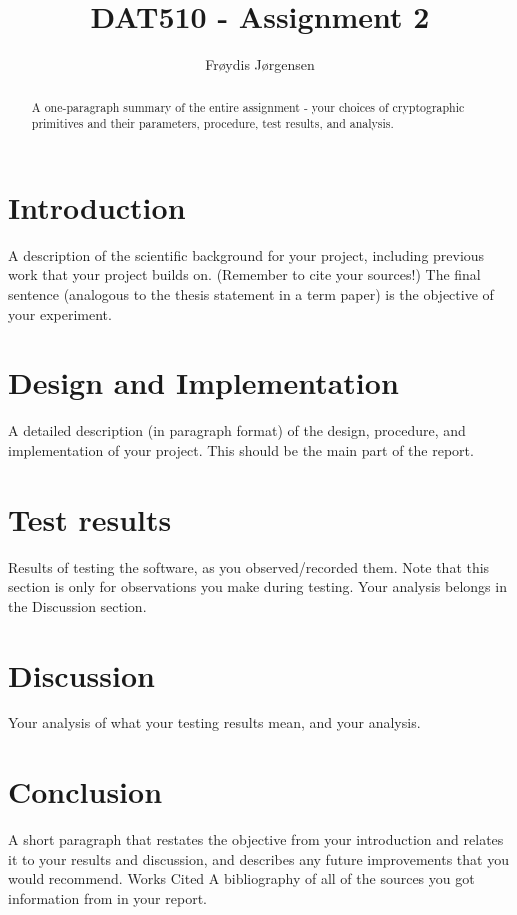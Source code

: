 \documentclass[12pt, letterpaper]{article}
\title{DAT510 - Assignment 2}
\author{Fr\o ydis J\o rgensen}
\begin{document}
\begin{titlepage}
\maketitle
\end{titlepage}


\begin{abstract}
A one-paragraph summary of the entire assignment - your choices of cryptographic primitives
and their parameters, procedure, test results, and analysis.
\end{abstract}

\section*{Introduction}
A description of the scientific background for your project, including previous work that your
project builds on. (Remember to cite your sources!) The final sentence (analogous to the thesis
statement in a term paper) is the objective of your experiment.

\section*{Design and Implementation}
A detailed description (in paragraph format) of the design, procedure, and implementation of
your project. This should be the main part of the report.

\section*{Test results}
Results of testing the software, as you observed/recorded them. Note that this section is only for
observations you make during testing. Your analysis belongs in the Discussion section.

\section*{Discussion}
Your analysis of what your testing results mean, and your analysis.

\section*{Conclusion}
A short paragraph that restates the objective from your introduction and relates it to your results
and discussion, and describes any future improvements that you would recommend. Works Cited A
bibliography of all of the sources you got information from in your report.
\end{document}
